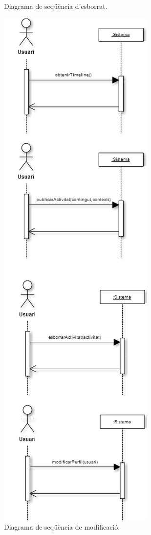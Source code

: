 \begin{figure}[ht]
\begin{minipage}[t]{.48\textwidth}
        \caption{Diagrama de seqüència d'esborrat.}
        \label{fig:model_conceptual_esborrar}
    \end{minipage}%
    \hfill
    \begin{minipage}[t]{.48\textwidth}
        \centering
        \includegraphics*[scale=0.7,viewport=0 0 322 265]{Memoria/Especificacio/model_comportament.png}
        \caption{Diagrama de seqüència de modificació.}
        \label{fig:model_conceptual_modificar}
    \end{minipage}
\end{figure}

\FloatBarrier 
